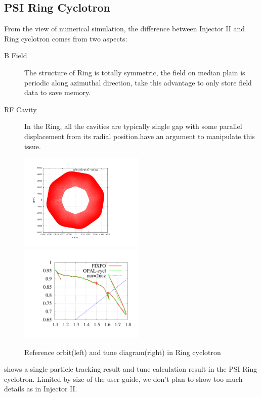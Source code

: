 \subsection{PSI  Ring Cyclotron}
\label{sec:Ring}
From the view of numerical simulation, the difference between Injector II and Ring cyclotron comes from two aspects:
\begin{description}
\item[B Field] The structure of Ring is totally symmetric, the field on median plain is periodic
along azimuthal direction, \opalcycl take this advantage to only store  field data to save memory.

\item[RF Cavity] In the Ring, all the cavities are typically single gap with some parallel displacement from its
radial position.\opalcycl have an argument  to manipulate this issue.
\end{description}
\begin{figure}[ht]
  \begin{center}
    \includegraphics[width=6cm,trim=2.5cm 2.5cm 2.5cm 2.5cm]{figures/cyclotron/AEO_Ring.png}
    \includegraphics[width=6cm,trim=2.5cm 2.5cm 2.5cm 2.5cm]{figures/cyclotron/nurnuz_Ring}
    \caption{Reference orbit(left) and tune diagram(right) in Ring cyclotron }
    \label{fig:Ring reference orbit and tune}
  \end{center}
\end{figure}
 shows a single particle tracking result and tune calculation result in the PSI Ring cyclotron.
Limited by size of the user guide, we don't plan to show too much details as in Injector II.

